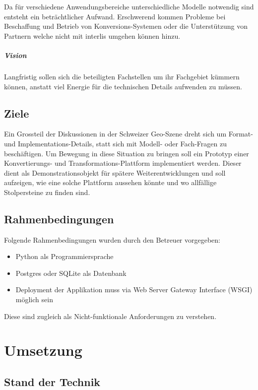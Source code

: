 Da für verschiedene Anwendungsbereiche unterschiedliche Modelle notwendig sind entsteht ein beträchtlicher Aufwand. Erschwerend kommen Probleme bei Beschaffung und Betrieb von Konversions-Systemen oder die Unterstützung von Partnern welche nicht mit  \gls{interlis} umgehen können hinzu.

\paragraph{Vision}
Langfristig sollen sich die beteiligten Fachstellen um ihr Fachgebiet kümmern können, anstatt viel Energie für die technischen Details aufwenden zu müssen. 

\section{Ziele}

Ein Grossteil der Diskussionen in der Schweizer Geo-Szene dreht sich um Format- und Implementations-Details, statt sich mit Modell- oder Fach-Fragen zu beschäftigen. Um Bewegung in diese Situation zu bringen soll ein Prototyp einer Konvertierungs- und Transformations-Plattform implementiert werden. Dieser dient als Demonstrationsobjekt für spätere Weiterentwicklungen und soll aufzeigen, wie eine solche Plattform aussehen könnte und wo allfällige Stolpersteine zu finden sind.

\section{Rahmenbedingungen}

Folgende Rahmenbedingungen wurden durch den Betreuer\cite{sfkeller} vorgegeben:

\begin{itemize}
\item Python als Programmiersprache
\item Postgres oder SQLite als Datenbank
\item Deployment der Applikation muss via Web Server Gateway Interface (WSGI) möglich sein
\end{itemize}

Diese sind zugleich als Nicht-funktionale Anforderungen zu verstehen.

\chapter{Umsetzung}

\section{Stand der Technik}

